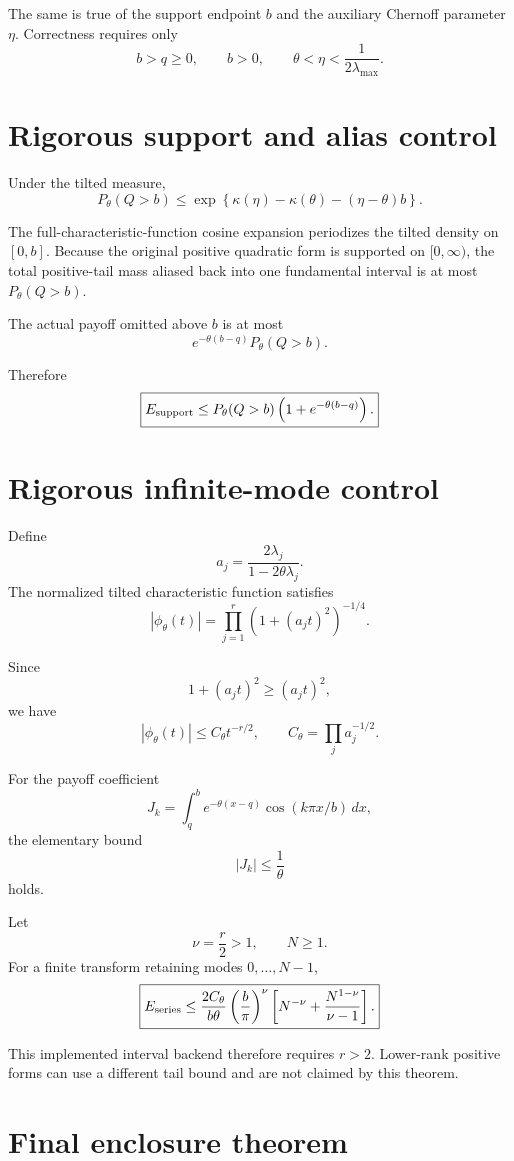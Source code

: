 The same is true of the support endpoint \(b\) and the auxiliary Chernoff
parameter \(\eta\).  Correctness requires only
\[
b>q\ge0,\qquad b>0,
\qquad
\theta<\eta<\frac{1}{2\lambda_{\max}}.
\]

\section{Rigorous support and alias control}

Under the tilted measure,
\[
P_\theta(Q>b)
\le
\exp\left\{
\kappa(\eta)-\kappa(\theta)-(\eta-\theta)b
\right\}.
\]

The full-characteristic-function cosine expansion periodizes the tilted density
on \([0,b]\).  Because the original positive quadratic form is supported on
\([0,\infty)\), the total positive-tail mass aliased back into one fundamental
interval is at most \(P_\theta(Q>b)\).

The actual payoff omitted above \(b\) is at most
\[
e^{-\theta(b-q)}P_\theta(Q>b).
\]

Therefore
\[
\boxed{
E_{\rm support}
\le
P_\theta(Q>b)
\left(
1+e^{-\theta(b-q)}
\right).
}
\]

\section{Rigorous infinite-mode control}

Define
\[
a_j=
\frac{2\lambda_j}{1-2\theta\lambda_j}.
\]
The normalized tilted characteristic function satisfies
\[
|\phi_\theta(t)|
=
\prod_{j=1}^r
\left(
1+(a_jt)^2
\right)^{-1/4}.
\]

Since
\[
1+(a_jt)^2\ge(a_jt)^2,
\]
we have
\[
|\phi_\theta(t)|
\le
C_\theta t^{-r/2},
\qquad
C_\theta=\prod_j a_j^{-1/2}.
\]

For the payoff coefficient
\[
J_k=
\int_q^b
e^{-\theta(x-q)}
\cos(k\pi x/b)\,dx,
\]
the elementary bound
\[
|J_k|\le\frac1\theta
\]
holds.

Let
\[
\nu=\frac r2>1,\qquad N\ge1.
\]
For a finite transform retaining modes \(0,\ldots,N-1\),
\[
\boxed{
E_{\rm series}
\le
\frac{2C_\theta}{b\theta}
\left(\frac{b}{\pi}\right)^\nu
\left[
N^{-\nu}
+
\frac{N^{1-\nu}}{\nu-1}
\right].
}
\]

This implemented interval backend therefore requires \(r>2\).  Lower-rank positive
forms can use a different tail bound and are not claimed by this theorem.

\section{Final enclosure theorem}

